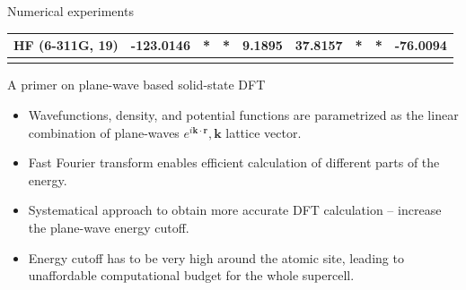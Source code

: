 \documentclass[aspectratio=169]{beamer}
\begin{document}
\begin{frame}{Numerical experiments}
\begin{table}[tb]
{\begin{tabular}{P{4cm} P{2cm} P{2cm} P{2cm} P{2cm} P{2cm} P{2cm} P{2cm}}
		\parbox{4cm}{HF (6-311G, 19)} 
		& -123.0146 &  * & * & 9.1895 & 37.8157 & * & * & \textbf{-76.0094}
		\\ \midrule[0.5pt]
	
	
	
		\\\bottomrule[1.5pt]
		\end{tabular}
		}
	\end{table}
\end{frame}




\begin{frame}{A primer on plane-wave based solid-state DFT}
	\begin{itemize}
		\item Wavefunctions, density, and potential functions are parametrized as the
		linear combination of plane-waves $e^{i\mathbf{k} \cdot \mathbf{r}}, \mathbf{k}$
		lattice vector.
		\item Fast Fourier transform enables efficient calculation of different
		parts of the energy.
		\item Systematical approach to obtain more accurate DFT calculation -- increase
		the plane-wave energy cutoff.
	\end{itemize}
	
	\begin{itemize}
		\item Energy cutoff has to be very high around the atomic site, leading to unaffordable
		computational budget for the whole supercell.
	\end{itemize}
\end{frame}
\end{document}
